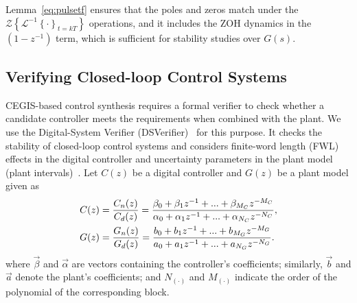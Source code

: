\documentclass[final]{sig-alternate-05-2015}
\newcommand{\red}[1]{{\color{red}#1}}
\begin{document}
Lemma~\ref{eq:pulsetf} ensures that the poles and zeros match under the
$\mathcal{Z}\left\lbrace{\mathcal{L}^{-1}\left\lbrace{\cdot}\right\rbrace_{t=kT}}\right\rbrace$
operations, and it includes the ZOH dynamics in the $(1-z^{-1})$ term, which
is sufficient for stability studies over $G(s)$.

\subsection{Verifying Closed-loop Control Systems}
\label{verifying-closed-loop-control-systems}




CEGIS-based control synthesis requires a formal verifier to check whether a
candidate controller meets the requirements when combined with the plant. 
We use the Digital-System Verifier (DSVerifier)~\cite{IsmailBCFF15} for this
purpose.  It checks the stability of closed-loop control systems and
considers finite-word length (FWL) effects in the digital controller and
uncertainty parameters in the plant model (plant intervals)~\cite{Bessa16}. 
Let $C(z)$ be a digital controller and $G(z)$ be a plant model given as
%
\begin{align}
\small
\label{controller_plant_tf}
C(z)&=\frac{C_n(z)}{C_d(z)}=\frac{\beta_{0}+\beta_{1}z^{-1}+...+\beta_{M_C}z^{-M_C}}{\alpha_{0}+\alpha_{1}z^{-1}+...+\alpha_{N_C}z^{-N_C}}, \\
G(z)&=\frac{G_n(z)}{G_d(z)}=\frac{b_{0}+b_{1}z^{-1}+...+b_{M_G}z^{-M_G}}{a_{0}+a_{1}z^{-1}+...+a_{N_G}z^{-N_G}}.
\end{align}
%
\noindent where $\vec{\beta}$ and $\vec{\alpha}$ are vectors containing the
controller's coefficients; similarly, $\vec{b}$ and $\vec{a}$ denote the
plant's coefficients; and $N_{(\cdot)}$ and $M_{(\cdot)}$ indicate the order
of the polynomial of the corresponding block.
\end{document}
